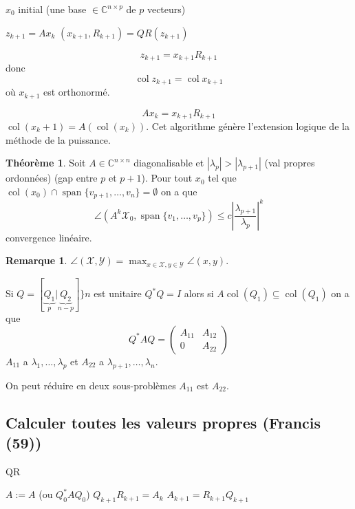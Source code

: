\documentclass[11pt,a4paper]{article}
\newcommand{\C}{\mathbb{C}}
\newcommand{\Cnn}{\C^{n\times n}}
\theoremstyle{definition}
\newtheorem{myrem}[mydef]{Remarque}
\newtheorem{mytheo}[mydef]{Théorème}
\DeclareMathOperator{\myspan}{span}
\DeclareMathOperator{\col}{col}
\begin{document}
\begin{algorithm}
  \caption{$x_0$ initial (une base $\in \C^{n \times p}$ de $p$ vecteurs)}
  \label{algo:newton}
  \begin{algorithmic}
    \STATE $z_{k+1} = Ax_k$
    \STATE $(x_{k+1},R_{k+1}) = QR(z_{k+1})$
    \ENDFOR
  \end{algorithmic}
\end{algorithm}

$$z_{k+1} = x_{k+1}R_{k+1}$$
donc
$$\col z_{k+1} = \col x_{k+1}$$
où $x_{k+1}$ est orthonormé.

$$Ax_k = x_{k+1} R_{k+1}$$
$\col(x_k+1) = A(\col(x_k))$.
Cet algorithme génère l'extension logique de la méthode de la puissance.

\begin{mytheo}
  Soit $A \in \Cnn$ diagonalisable et $|\lambda_p| > |\lambda_{p+1}|$ (val propres ordonnées) (gap entre $p$ et $p+1$).
  Pour tout $x_0$ tel que $\col(x_0) \cap \myspan\{v_{p+1},\ldots,v_n\} = \emptyset$ on a que
  $$\angle(A^k\mathcal{X}_0,\myspan\{v_1,\ldots,v_p\}) \leq c \left|\frac{\lambda_{p+1}}{\lambda_p}\right|^k$$
  convergence linéaire.
\end{mytheo}

\begin{myrem}
  $\angle(\mathcal{X},\mathcal{Y}) = \max_{x \in \mathcal{X},y\in \mathcal{Y}} \angle (x, y)$.
\end{myrem}

Si $Q = [\underbrace{Q_1}_{p}|\underbrace{Q_2}_{n-p}]\}n$ est unitaire $Q^*Q = I$ alors si $A\col(Q_1) \subseteq \col(Q_1)$ on a que
$$Q^* A Q =
\begin{pmatrix}
  A_{11} & A_{12}\\
  0 & A_{22}
\end{pmatrix}$$
$A_{11}$ a $\lambda_1,\ldots,\lambda_p$ et $A_{22}$ a $\lambda_{p+1},\ldots,\lambda_n$.

On peut réduire en deux sous-problèmes $A_{11}$ est $A_{22}$.

\subsection{Calculer toutes les valeurs propres (Francis (59))}

\begin{algorithm}
  \caption{QR}
  \label{algo:qr}
  \begin{algorithmic}
    \STATE $A := A$ (ou $Q_0^* A Q_0$)
    \STATE $Q_{k+1}R_{k+1} = A_k$
    \STATE $A_{k+1} = R_{k+1}Q_{k+1}$
    \ENDFOR
  \end{algorithmic}
\end{algorithm}
\end{document}
